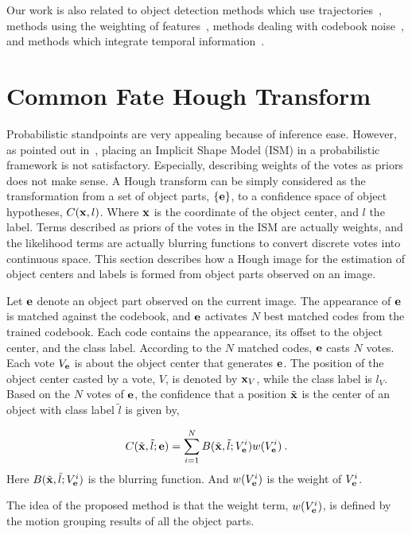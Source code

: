 \documentclass{mva2011}
\begin{document}
Our work is also related to object detection methods which use trajectories~\cite{my9,ac24}, methods using the weighting of features~\cite{ij13}, methods dealing with codebook noise~\cite{ac19}, and methods which integrate temporal information~\cite{ac23}.

\section{Common Fate Hough Transform}
Probabilistic standpoints are very appealing because of inference ease. However, as pointed out in~\cite{ac27}, placing an Implicit Shape Model (ISM) in a probabilistic framework is not satisfactory. Especially, describing weights of the votes as priors does not make sense.
A Hough transform can be simply considered as the transformation from a set of  object parts, $\{\bf{e}\}$,  to a confidence space of object hypotheses, $C({\bf{x}},l)$. Where $\bf{x}$ is the coordinate of the object center, and $l$ the label. Terms described as priors of the votes in the ISM are actually weights, and the likelihood terms are actually blurring functions to convert discrete votes into continuous space. This section describes how a Hough image for the estimation of object centers and labels is formed from object parts observed on an image.


Let $\bf{e}$ denote an object part observed on the current image. The appearance of $\bf{e}$ is matched against the codebook, and $\bf{e}$ activates $N$ best matched codes from the trained codebook. Each code contains the appearance, its offset to the object center, and the class label. According to the $N$ matched codes, $\bf{e}$ casts $N$ votes. Each vote $V_{\bf{e}}$ is about the object center that generates $\bf{e}$. The position of the object center casted by  a vote, $V$, is denoted by ${\bf{x}}_V$, while the class label is $l_V$. Based on the $N$ votes of $\bf{e}$, the confidence that a position $\tilde{\bf{x}}$ is the center of an object with class label $\tilde{l}$ is given by,

\begin{equation}C({\tilde{\bf{x}}},\tilde{l};{\bf{e}}) = \sum\limits^N_{i=1} {B({\tilde{\bf{x}}},{\tilde{l}};{V_{\bf{e}}^i}) w({V_{\bf{e}}^i})}\:.
\label{eq1}
\end{equation}
Here $B({\tilde{\bf{x}}},{\tilde{l}};{V_{\bf{e}}^i})$ is the blurring function. And $w({V_{\bf{e}}^i})$ is the weight of ${V_{\bf{e}}^i}$.

The idea of the proposed method is that the weight term, $w({V_{\bf{e}}^i})$, is defined by the motion grouping results of all the object parts.
\end{document}
